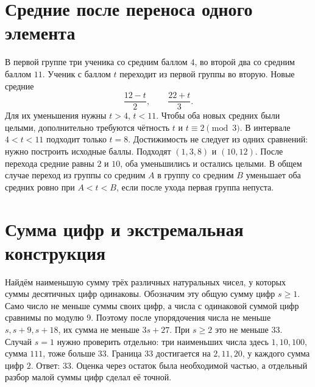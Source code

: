\section{Средние после переноса одного элемента}
\begin{example}\label{ex:review-ege-c21-3}
В первой группе три ученика со средним баллом \(4\), во второй два со средним баллом \(11\). Ученик с баллом \(t\) переходит из первой группы во вторую. Новые средние
\[
\frac{12-t}{2},\qquad\frac{22+t}{3}.
\]
Для их уменьшения нужны \(t>4\), \(t<11\). Чтобы оба новых средних были целыми, дополнительно требуются чётность \(t\) и \(t\equiv2\pmod3\). В интервале \(4<t<11\) подходит только \(t=8\). Достижимость не следует из одних сравнений: нужно построить исходные баллы. Подходят \((1,3,8)\) и \((10,12)\). После перехода средние равны \(2\) и \(10\), оба уменьшились и остались целыми. В общем случае переход из группы со средним \(A\) в группу со средним \(B\) уменьшает оба средних ровно при \(A<t<B\), если после ухода первая группа непуста.
\end{example}

\section{Сумма цифр и экстремальная конструкция}
\begin{example}\label{ex:review-ege-c21-4}
Найдём наименьшую сумму трёх различных натуральных чисел, у которых суммы десятичных цифр одинаковы. Обозначим эту общую сумму цифр \(s\ge1\). Само число не меньше суммы своих цифр, а числа с одинаковой суммой цифр сравнимы по модулю \(9\). Поэтому после упорядочения числа не меньше \(s,s+9,s+18\), их сумма не меньше \(3s+27\). При \(s\ge2\) это не меньше \(33\). Случай \(s=1\) нужно проверить отдельно: три наименьших числа здесь \(1,10,100\), сумма \(111\), тоже больше \(33\). Граница \(33\) достигается на \(2,11,20\), у каждого сумма цифр \(2\). Ответ: \(33\). Оценка через остаток была необходимой частью, а отдельный разбор малой суммы цифр сделал её точной.
\end{example}

